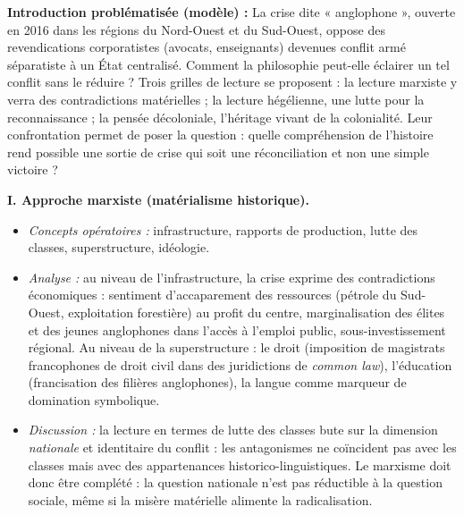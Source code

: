 \documentclass[11pt]{article}
\begin{document}
\begin{corrige}
\textbf{Introduction problématisée (modèle) :} La crise dite « anglophone », ouverte en 2016 dans les régions du Nord-Ouest et du Sud-Ouest, oppose des revendications corporatistes (avocats, enseignants) devenues conflit armé séparatiste à un État centralisé. Comment la philosophie peut-elle éclairer un tel conflit sans le réduire ? Trois grilles de lecture se proposent : la lecture marxiste y verra des contradictions matérielles ; la lecture hégélienne, une lutte pour la reconnaissance ; la pensée décoloniale, l'héritage vivant de la colonialité. Leur confrontation permet de poser la question : quelle compréhension de l'histoire rend possible une sortie de crise qui soit une réconciliation et non une simple victoire ?

\textbf{I. Approche marxiste (matérialisme historique).}
\begin{itemize}
\item \emph{Concepts opératoires :} infrastructure, rapports de production, lutte des classes, superstructure, idéologie.
\item \emph{Analyse :} au niveau de l'infrastructure, la crise exprime des contradictions économiques : sentiment d'accaparement des ressources (pétrole du Sud-Ouest, exploitation forestière) au profit du centre, marginalisation des élites et des jeunes anglophones dans l'accès à l'emploi public, sous-investissement régional. Au niveau de la superstructure : le droit (imposition de magistrats francophones de droit civil dans des juridictions de \emph{common law}), l'éducation (francisation des filières anglophones), la langue comme marqueur de domination symbolique.
\item \emph{Discussion :} la lecture en termes de lutte des classes bute sur la dimension \emph{nationale} et identitaire du conflit : les antagonismes ne coïncident pas avec les classes mais avec des appartenances historico-linguistiques. Le marxisme doit donc être complété : la question nationale n'est pas réductible à la question sociale, même si la misère matérielle alimente la radicalisation.
\end{itemize}


\end{corrige}
\end{document}
